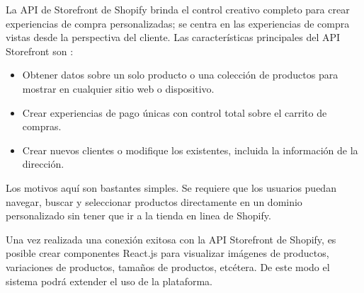 La API de Storefront de Shopify brinda el control creativo completo para crear experiencias de compra personalizadas; se centra en las experiencias de compra vistas desde la perspectiva del cliente. Las características principales del API Storefront son \cite{storefront}:
\begin{itemize}
  \item Obtener datos sobre un solo producto o una colección de productos para mostrar en cualquier sitio web o dispositivo.
  \item Crear experiencias de pago únicas con control total sobre el carrito de compras.
  \item Crear nuevos clientes o modifique los existentes, incluida la información de la dirección.
\end{itemize}
Los motivos aquí son bastantes simples. Se requiere que los usuarios puedan navegar, buscar y seleccionar productos directamente en un dominio personalizado sin tener que ir a la tienda en linea de Shopify.
\vspace{0.8cm}

Una vez realizada una conexión exitosa con la API Storefront de Shopify, es posible crear componentes React.js para visualizar imágenes de productos, variaciones de productos, tamaños de productos, etcétera. De este modo el sistema podrá extender el uso de la plataforma.

\newpage
